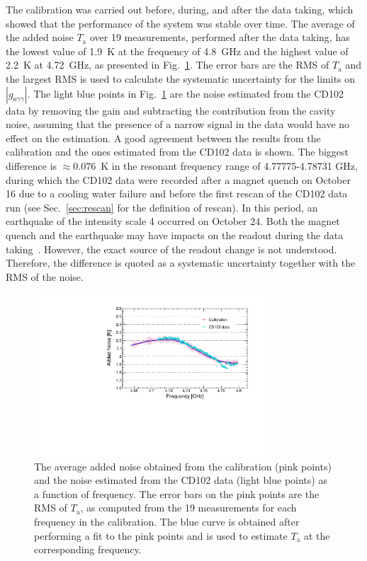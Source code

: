 \documentclass[%
reprint, %
superscriptaddress,
 amsmath,amssymb,
 aps
]{revtex4-2}
\begin{document}
The calibration was carried out before, during, and after the data taking, 
which showed that the performance of the system was stable over time. The 
average of the added noise $T_\text{a}$ over 19 measurements, performed after 
the data taking, has the lowest 
value of 1.9~K at the frequency of 4.8~GHz and the highest value of 
2.2~K at 4.72~GHz, as presented in Fig.~\ref{fig:hemtcalvsf}. 
The error bars are the RMS of $T_\text{a}$ and the largest RMS is used to 
calculate the systematic uncertainty for the limits on 
$\left|g_{a\gamma\gamma}\right|$. The light blue points in 
Fig.~\ref{fig:hemtcalvsf} are the noise estimated from the CD102 data by 
removing the gain and subtracting the contribution from the cavity noise, 
assuming 
that the presence of a narrow signal in the data would have no effect on the 
estimation. A good agreement between the results from the calibration  
and the ones estimated from the CD102 data is shown. %
The biggest difference is $\approx0.076$~K in the resonant frequency range 
of 4.77775-4.78731 GHz, during which the CD102 data were recorded after a magnet quench 
on October 16 due to a cooling water failure and before the first rescan of the 
CD102 data run (see Sec.~\ref{sec:rescan} for the definition of rescan). In this 
period,  an earthquake of the intensity scale 4 occurred on October 24. 
Both the magnet quench and the earthquake may have impacts on the readout during 
the data taking~\cite{TASEHInstrumentation}. 
However, the exact source of the readout change is not understood. 
Therefore, the difference is quoted as a systematic uncertainty together 
with the RMS of the noise.

\begin{figure} [htbp]
  \centering
  \includegraphics[width=8.6cm]{Figure1.pdf}
  \caption{The average added noise obtained from the calibration (pink points)
 and the noise estimated from the CD102 data (light blue points) as a 
function of frequency. The error bars on the pink points are the RMS 
of $T_\text{a}$, as computed from the 19 measurements for each frequency 
in the calibration. 
The blue curve is obtained after performing a fit to 
the pink points and is used to estimate $T_\text{a}$ at the corresponding 
frequency.}
  \label{fig:hemtcalvsf}
\end{figure}
\end{document}
